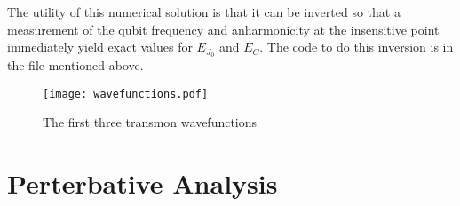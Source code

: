 \documentclass[twocolumn]{article}
\begin{document}
The utility of this numerical solution is that it can be inverted so that a measurement of the qubit frequency and anharmonicity at the insensitive point immediately yield exact values for $E_{J_0}$ and $E_C$. The code to do this inversion is in the file mentioned above.

\begin{figure}
\begin{centering}
\texttt{[image: wavefunctions.pdf]} 
\par\end{centering}
\caption{The first three transmon wavefunctions}
\label{Fig:wavefunctions}
\end{figure}


\section{Perterbative Analysis}
\end{document}
